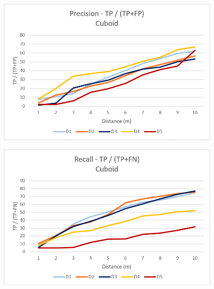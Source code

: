\documentclass{subfiles}
\begin{document}
        \begin{figure} [h!]
        	\centering
        	\includegraphics[width=\textwidth]{img/dead/results/Precision_Cuboid}
        	\caption{}
        	\label{fig:Precision_Cuboid}
        \end{figure}
    
        \begin{figure} [h!]
        	\centering
        	\includegraphics[width=\textwidth]{img/dead/results/Recall_Cuboid}
        	\caption{}
        	\label{fig:Recall_Cuboid}
        \end{figure}
    
\end{document}
